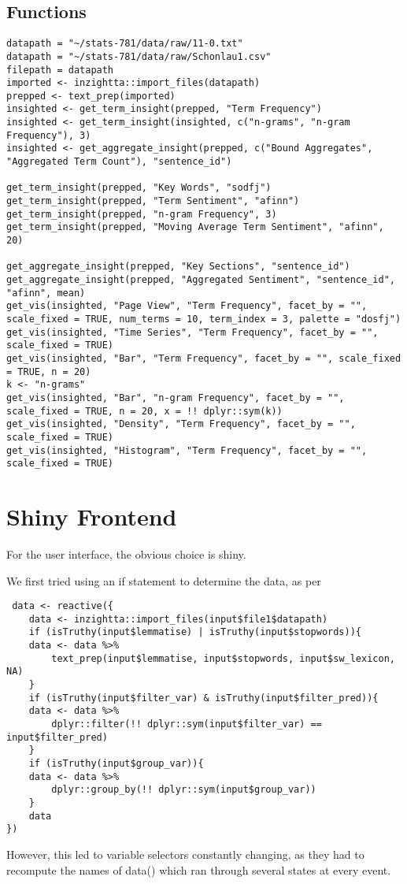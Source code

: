 \documentclass[a4paper, 11pt]{article}
\begin{document}
\subsection{Functions}
\label{sec:orgc66ae99}
\begin{verbatim}
datapath = "~/stats-781/data/raw/11-0.txt"
datapath = "~/stats-781/data/raw/Schonlau1.csv"
filepath = datapath
imported <- inzightta::import_files(datapath)
prepped <- text_prep(imported)
insighted <- get_term_insight(prepped, "Term Frequency")
insighted <- get_term_insight(insighted, c("n-grams", "n-gram Frequency"), 3)
insighted <- get_aggregate_insight(prepped, c("Bound Aggregates", "Aggregated Term Count"), "sentence_id")

get_term_insight(prepped, "Key Words", "sodfj")
get_term_insight(prepped, "Term Sentiment", "afinn")
get_term_insight(prepped, "n-gram Frequency", 3)
get_term_insight(prepped, "Moving Average Term Sentiment", "afinn", 20)

get_aggregate_insight(prepped, "Key Sections", "sentence_id")
get_aggregate_insight(prepped, "Aggregated Sentiment", "sentence_id", "afinn", mean)
get_vis(insighted, "Page View", "Term Frequency", facet_by = "", scale_fixed = TRUE, num_terms = 10, term_index = 3, palette = "dosfj")
get_vis(insighted, "Time Series", "Term Frequency", facet_by = "", scale_fixed = TRUE)
get_vis(insighted, "Bar", "Term Frequency", facet_by = "", scale_fixed = TRUE, n = 20)
k <- "n-grams"
get_vis(insighted, "Bar", "n-gram Frequency", facet_by = "", scale_fixed = TRUE, n = 20, x = !! dplyr::sym(k))
get_vis(insighted, "Density", "Term Frequency", facet_by = "", scale_fixed = TRUE)
get_vis(insighted, "Histogram", "Term Frequency", facet_by = "", scale_fixed = TRUE)
\end{verbatim}
\section{Shiny Frontend}
\label{sec:orgc31f8c9}
For the user interface, the obvious choice is shiny.

We first tried using an if statement to determine the data, as per
\begin{verbatim}
 data <- reactive({
    data <- inzightta::import_files(input$file1$datapath)
    if (isTruthy(input$lemmatise) | isTruthy(input$stopwords)){
	data <- data %>%
	    text_prep(input$lemmatise, input$stopwords, input$sw_lexicon, NA)
    }
    if (isTruthy(input$filter_var) & isTruthy(input$filter_pred)){
	data <- data %>%
	    dplyr::filter(!! dplyr::sym(input$filter_var) == input$filter_pred)
    }
    if (isTruthy(input$group_var)){
	data <- data %>%
	    dplyr::group_by(!! dplyr::sym(input$group_var))
    }
    data
})
\end{verbatim}
However, this led to variable selectors constantly changing, as they had to recompute the names of data() which ran through several states at every event.
\end{document}
